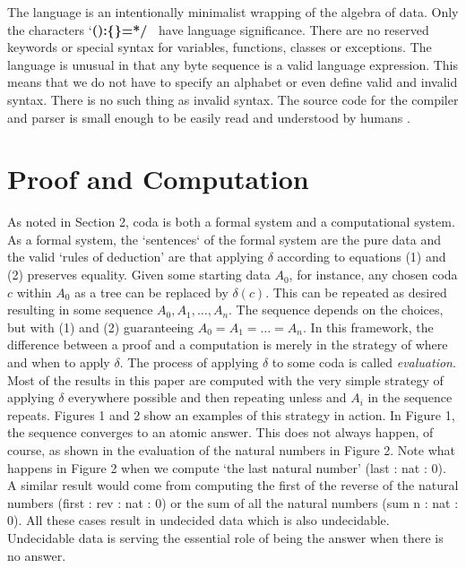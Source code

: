\documentclass[11pt]{article}
\begin{document}
     The language is an intentionally minimalist wrapping of the algebra of data. 
Only the characters `{\bf():\{\}=*/\ } have language significance.  There are no reserved keywords or 
special syntax for variables, functions, classes or exceptions.  The language is unusual in that any byte sequence is a valid language expression.  
This means that we do not have to specify an alphabet or even define valid and invalid syntax.  There is no such thing 
as invalid syntax.  The source code for the compiler and parser is small enough to be easily read and understood by 
humans \cite{github}.

\section{Proof and Computation}

     As noted in Section 2, coda is both a formal system and a computational system.  As a formal system, the `sentences` of the formal system 
are the pure data and the valid `rules of deduction' are that applying $\delta$ according to equations (1) and (2) preserves equality.  
Given some starting data $A_0$, for instance, any chosen coda $c$ within $A_0$ as a tree can be replaced by $\delta(c)$.  This can be repeated 
as desired resulting in some sequence $A_0,A_1,\dots,A_n$.  The sequence depends on the choices, but with (1) and (2) guaranteeing 
$A_0=A_1=\dots=A_n$.  In this framework, the difference between a proof and a computation is merely in the strategy of where and 
when to apply $\delta$.  The process of applying $\delta$ to some coda is called {\it evaluation}.  Most of the results in this paper 
are computed with the very simple strategy of applying $\delta$ everywhere possible and then repeating unless and $A_i$ in the sequence 
repeats.  Figures 1 and 2 show an examples of this strategy in action.  In Figure 1, the sequence converges to an atomic answer.  This does 
not always happen, of course, as shown in the evaluation of the natural numbers in Figure 2.  Note what happens in Figure 2 when we compute 
`the last natural number' 
(last : nat : 0).  A similar result would come from computing the first of the reverse of the natural numbers (first : rev : nat : 0) or the sum of all 
the natural numbers (sum n : nat : 0).  All these cases result in undecided data which is also undecidable.  Undecidable data is serving the 
essential role of being the answer when there is no answer.  
\end{document}
